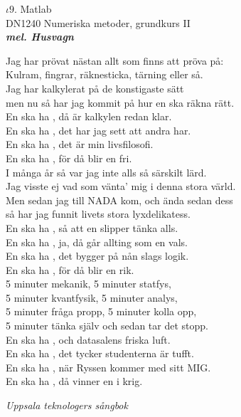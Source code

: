 \documentclass[a6paper,10pt]{article}
\newcommand{\mel}[1]{\small\textbf{\textit{mel. #1 \\}}}
\begin{document}
\setlength{\oddsidemargin}{-0.47in}
\noindent
\begin{center}
\Large $\iota9$. Matlab \\ 
\footnotesize DN1240 Numeriska metoder, grundkurs II\\
\mel{Husvagn}
\end{center}
Jag har prövat nästan allt som finns att pröva på:\\
Kulram, fingrar, räknesticka, tärning eller så.\\
Jag har kalkylerat på de konstigaste sätt\\
men nu så har jag kommit på hur en ska räkna rätt.
\vspace{5pt} \\
En ska ha , då är kalkylen redan klar.\\
En ska ha , det har jag sett att andra har.\\
En ska ha , det är min livsfilosofi.\\
En ska ha , för då blir en fri.
\vspace{5pt} \\
I många år så var jag inte alls så särskilt lärd.\\
Jag visste ej vad som vänta’ mig i denna stora värld.\\
Men sedan jag till NADA kom, och ända sedan dess\\
så har jag funnit livets stora lyxdelikatess.
\vspace{5pt} \\
En ska ha , så att en slipper tänka alls.\\
En ska ha , ja, då går allting som en vals.\\
En ska ha , det bygger på nån slags logik.\\
En ska ha , för då blir en rik.
\vspace{5pt} \\
5 minuter mekanik, 5 minuter statfys,\\
5 minuter kvantfysik, 5 minuter analys,\\
5 minuter fråga propp, 5 minuter kolla opp,\\
5 minuter tänka själv och sedan tar det stopp.
\vspace{5pt} \\
En ska ha , och datasalens friska luft.\\
En ska ha , det tycker studenterna är tufft.\\
En ska ha , när Ryssen kommer med sitt MIG.\\
En ska ha , då vinner en i krig.
\begin{flushright}
\textit{Uppsala teknologers sångbok}
\end{flushright}
\end{document}
